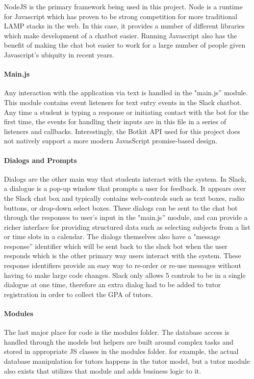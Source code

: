 NodeJS is the primary framework being used in this project.  Node is a runtime
for Javascript which has proven to be strong competition for more traditional
LAMP stacks in the web.  In this case, it provides a number of different
libraries which make development of a chatbot easier.  Running Javascript also
has the benefit of making the chat bot easier to work for a large number of
people given Javascript's ubiquity in recent years.

\paragraph{Main.js}
Any interaction with the application via text is handled in the "main.js''
module. This module contains event listeners for text entry events in the Slack
chatbot.  Any time a student is typing a response or initiating contact with the
bot for the first time, the events for handling their inputs are in this file in
a series of listeners and callbacks.  Interestingly, the Botkit API used for
this project does not natively support a more modern JavasScript promise-based
design.

\paragraph{Dialogs and Prompts}
Dialogs are the other main way that students interact with the system.  In
Slack, a dialogue is a pop-up window that prompts a user for feedback. It appears over the Slack chat box and typically
contains web-controls such as text boxes, radio buttons, or drop-down select
boxes. These dialogs can be sent to the chat bot through the responses to user's
input in the "main.js'' module, and can provide a richer interface for
providing structured data such as selecting subjects from a list or time slots
in a calendar.  The dialogs themselves also have a "message response''
identifier which will be sent back to the slack bot when the user responds
which is the other primary way users interact with the system.  These response
identifiers provide an easy way to re-order or re-use messages without having to
make large code changes.  %
Slack only allows 5 controls to be in a single dialogue at one
time, therefore an extra dialog had to be added to tutor registration in order to collect the GPA of tutors.

\paragraph{Modules}
The last major place for code is the modules folder.  The database access is
handled through the models but helpers are built around complex tasks and stored
in appropriate JS classes in the modules folder.  for example, the actual
database manipulation for tutors happens in the tutor model, but a tutor module
also exists that utilizes that module and adds business logic to it.  


